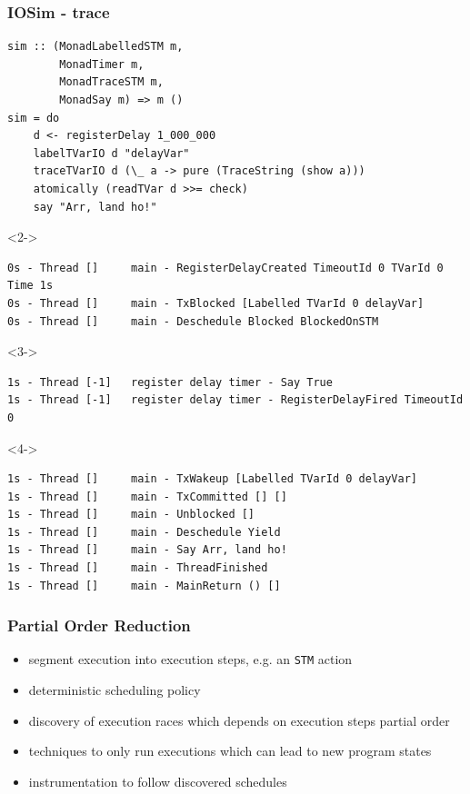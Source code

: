 \documentclass[t,x11names,xcolor={x11names},hyperref={colorlinks,citecolor=Blue4,linkcolor=Blue4,anchorcolor=Blue4,urlcolor=Blue4}]{beamer}
\begin{document}
\begin{frame}[fragile]
  \frametitle{IOSim - trace}
  {\scriptsize
  \begin{verbatim}
sim :: (MonadLabelledSTM m,
        MonadTimer m,
        MonadTraceSTM m,
        MonadSay m) => m ()
sim = do
    d <- registerDelay 1_000_000
    labelTVarIO d "delayVar"
    traceTVarIO d (\_ a -> pure (TraceString (show a)))
    atomically (readTVar d >>= check)
    say "Arr, land ho!"
  \end{verbatim}
  }

  {\tiny
  \begin{onlyenv}<2->
  \begin{verbatim}
0s - Thread []     main - RegisterDelayCreated TimeoutId 0 TVarId 0 Time 1s
0s - Thread []     main - TxBlocked [Labelled TVarId 0 delayVar]
0s - Thread []     main - Deschedule Blocked BlockedOnSTM
  \end{verbatim}
  \end{onlyenv}
  \begin{onlyenv}<3->
  \begin{verbatim}
1s - Thread [-1]   register delay timer - Say True
1s - Thread [-1]   register delay timer - RegisterDelayFired TimeoutId 0
  \end{verbatim}
  \end{onlyenv}
  \begin{onlyenv}<4->
  \begin{verbatim}
1s - Thread []     main - TxWakeup [Labelled TVarId 0 delayVar]
1s - Thread []     main - TxCommitted [] []
1s - Thread []     main - Unblocked []
1s - Thread []     main - Deschedule Yield
1s - Thread []     main - Say Arr, land ho!
1s - Thread []     main - ThreadFinished
1s - Thread []     main - MainReturn () []
  \end{verbatim}
  \end{onlyenv}
 }

\end{frame}


\begin{frame}
  \frametitle{Partial Order Reduction}

  \begin{itemize}
    \item segment execution into execution steps, e.g. an \texttt{STM} action
    \item deterministic scheduling policy
    \item discovery of execution races which depends on execution steps partial
          order
    \item techniques to only run executions which can lead to new program
          states
    \item instrumentation to follow discovered schedules
  \end{itemize}
\end{frame}
\end{document}
